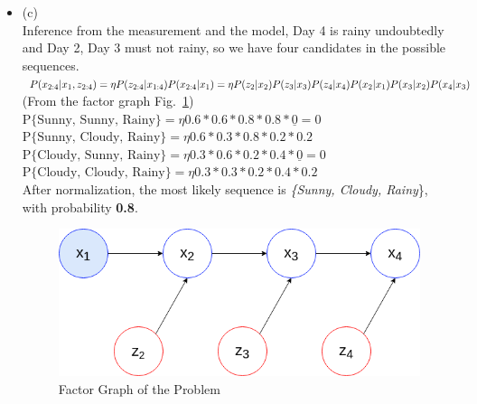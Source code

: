\documentclass[12pt,a4paper]{article}
\begin{document}
\begin{itemize}
\item{(c)} \\
Inference from the measurement and the model, Day 4 is rainy undoubtedly and Day 2, Day 3 must not rainy, so we have four candidates in the possible sequences. \\
$P(x_\text{2:4}|x_1, z_\text{2:4})\\= \eta P(z_\text{2:4}|x_\text{1:4})P(x_\text{2:4}|x_1) \\ 
 = \eta P(z_2|x_2)P(z_3|x_3)P(z_4|x_4)P(x_2|x_1)P(x_3|x_2)P(x_4|x_3) $ (\small\small From the factor graph Fig.~\ref{fig:fac}) \\

$\text{P\{Sunny, Sunny, Rainy\}} =   \eta 0.6*0.6*0.8*0.8*\underline{0} = 0$ \\
$\text{P\{Sunny, Cloudy, Rainy\}} =  \eta 0.6*0.3*0.8*0.2*0.2$ \\
$\text{P\{Cloudy, Sunny, Rainy\}} =  \eta 0.3*0.6*0.2*0.4*\underline{0} = 0$ \\
$\text{P\{Cloudy, Cloudy, Rainy\}} = \eta 0.3*0.3*0.2*0.4*0.2$ \\

After normalization, the most likely sequence is \textit{ \{Sunny, Cloudy, Rainy}\}, with probability \textbf{0.8}.
\begin{figure}
  \centering
  \includegraphics[scale=0.3]{factor_graph.png}
  \caption{Factor Graph of the Problem}
  \label{fig:fac}
\end{figure}

\end{itemize}
\end{document}

